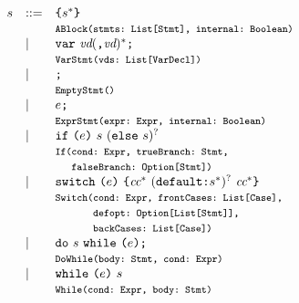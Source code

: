 \[\begin{array}{llll}
\stmt &::=& \verb+{+\stmt^*\verb+}+ \\
&& \mtt{ABlock(stmts:~List[Stmt], internal:~Boolean)}\\
& \mid & {\tt var} \ \vd(\verb+,+ \vd)^* \verb+;+ \\
&& \mtt{VarStmt(vds:~List[VarDecl])}\\
& \mid & \verb+;+ \\
&& \mtt{EmptyStmt()}\\
& \mid & \expr \verb+;+ \\
&& \mtt{ExprStmt(expr:~Expr, internal:~Boolean)}\\
& \mid & {\tt if} \ \verb+(+\expr\verb+)+ \ \stmt \ ({\tt else} \ \stmt)^?\\
&& \mtt{If(cond:~Expr, trueBranch:~Stmt,}\\
&&\mtt{\phantom{If(}falseBranch:~Option[Stmt])}\\
& \mid &  {\tt switch} \ \verb+(+\expr\verb+)+ \ \verb+{+\cc^* \ ({\tt default} \verb+:+ \stmt^{*})^? \ \cc^* \verb+}+\\
&& \mtt{Switch(cond:~Expr, frontCases:~List[Case],}\\
&&\mtt{\phantom{Switch(}defopt:~Option[List[Stmt]],}\\
&&\mtt{\phantom{Switch(}backCases:~List[Case])}\\
& \mid & {\tt do} \ \stmt \ {\tt while} \ \verb+(+\expr\verb+)+ \verb+;+ \\
&& \mtt{DoWhile(body:~Stmt, cond:~Expr)}\\
  &\mid& {\tt while} \ \verb+(+\expr\verb+)+ \ \stmt \\
&& \mtt{While(cond:~Expr, body:~Stmt)}\\
\end{array}
\]

